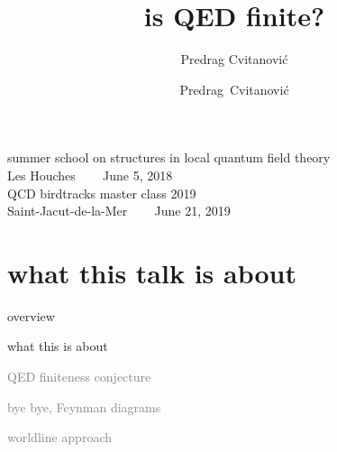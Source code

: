 



\usepackage{booktabs} %
\usepackage[font=scriptsize, labelfont=bf]{caption}
\usepackage[
    backend=biber,  %
    sorting=nyt,
    style=numeric, %
    natbib=true,
    style=phys, %
    biblabel= brackets, %
    articletitle=false, %
    pageranges = true , %
    sortlocale=en_US,
    firstinits=true,
    url=false, %
    doi=false, %
    eprint=false
]{biblatex}


\renewcommand{\Ssym}[1]{{\ensuremath{m_{#1}}}}    %




\title{
{\huge is QED finite?}
}
\author{Predrag Cvitanovi\'c}
\author[Cvitanovi\'c]
{
  \textcolor{green!50!black}{
  {Predrag~Cvitanovi\'c
  }	%
  }
}
\institute
{
summer school on structures in local quantum field theory
\\
Les Houches ~~~ June 5, 2018\\[1ex]
QCD birdtracks master class 2019\\Saint-Jacut-de-la-Mer ~~~ June 21, 2019
 }
\date{} %

\begin{frame}
  \titlepage
\end{frame}

\section[what this talk is about]
 {what this talk is about}

\begin{frame}{overview}
\begin{enumerate}
              \item {\Large
what this is about
                  }\textcolor{gray}{\small
              \item
QED finiteness conjecture
              \item
bye bye, Feynman diagrams
              \item
worldline approach
                    }
\end{enumerate}
\end{frame}

